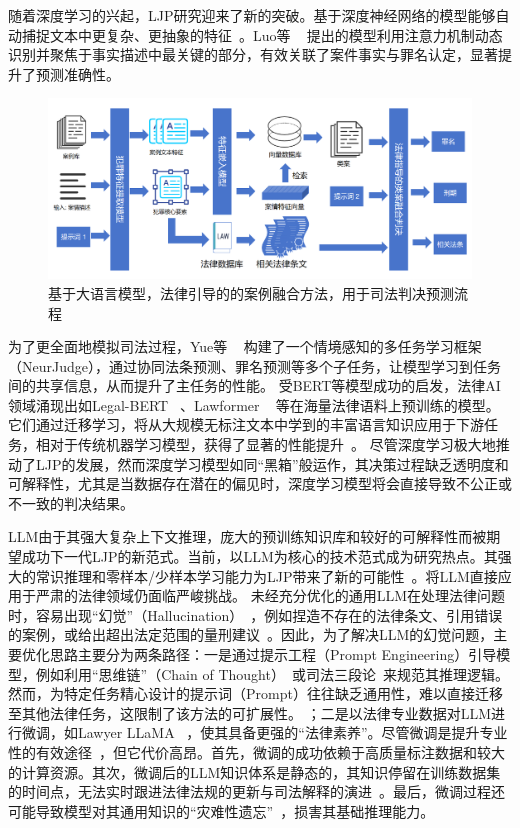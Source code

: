 随着深度学习的兴起，LJP研究迎来了新的突破。基于深度神经网络的模型能够自动捕捉文本中更复杂、更抽象的特征~\cite{cheng2025legal,dong2021legal,feng2022legal,jiang2018interpretable}。Luo等 ~\cite{huang2019improved} 提出的模型利用注意力机制动态识别并聚焦于事实描述中最关键的部分，有效关联了案件事实与罪名认定，显著提升了预测准确性。
\begin{figure}[htpb]
	\centering
	\includegraphics[width=1\textwidth]{fig/method.pdf}
	\caption{基于大语言模型，法律引导的的案例融合方法，用于司法判决预测流程}
	\label{fig:main}
\end{figure}
为了更全面地模拟司法过程，Yue等 ~\cite{yue2021neurjudge} 构建了一个情境感知的多任务学习框架（NeurJudge），通过协同法条预测、罪名预测等多个子任务，让模型学习到任务间的共享信息，从而提升了主任务的性能。
受BERT等模型成功的启发，法律AI领域涌现出如Legal-BERT ~\cite{liu2021robustly,chalkidis2020legal,deepa2021bidirectional,devlin2019bert,fan2022multi}、Lawformer ~\cite{xiao2021lawformer,du2022glm,fei2023lawbench} 等在海量法律语料上预训练的模型。它们通过迁移学习，将从大规模无标注文本中学到的丰富语言知识应用于下游任务，相对于传统机器学习模型，获得了显著的性能提升~\cite{cui2021pre,houlsby2019parameter,hu2018few}。
尽管深度学习极大地推动了LJP的发展，然而深度学习模型如同“黑箱”般运作，其决策过程缺乏透明度和可解释性，尤其是当数据存在潜在的偏见时，深度学习模型将会直接导致不公正或不一致的判决结果。

LLM由于其强大复杂上下文推理，庞大的预训练知识库和较好的可解释性而被期望成功下一代LJP的新范式。当前，以LLM为核心的技术范式成为研究热点。其强大的常识推理和零样本/少样本学习能力为LJP带来了新的可能性~\cite{brown2020language,huang2022towards}。将LLM直接应用于严肃的法律领域仍面临严峻挑战。
未经充分优化的通用LLM在处理法律问题时，容易出现“幻觉”（Hallucination）~\cite{cui2023survey}，例如捏造不存在的法律条文、引用错误的案例，或给出超出法定范围的量刑建议~\cite{lewis2020retrieval}。因此，为了解决LLM的幻觉问题，主要优化思路主要分为两条路径：一是通过提示工程（Prompt Engineering）引导模型，例如利用“思维链”（Chain of Thought）~\cite{kojima2022large,izacard2021leveraging}或司法三段论~\cite{huang2023lawyer}来规范其推理逻辑。然而，为特定任务精心设计的提示词（Prompt）往往缺乏通用性，难以直接迁移至其他法律任务，这限制了该方法的可扩展性。
；二是以法律专业数据对LLM进行微调，如Lawyer LLaMA ~\cite{chen2020recall}，使其具备更强的“法律素养”。尽管微调是提升专业性的有效途径~\cite{hu2021lora,hu2022lora}，但它代价高昂。首先，微调的成功依赖于高质量标注数据和较大的计算资源。其次，微调后的LLM知识体系是静态的，其知识停留在训练数据集的时间点，无法实时跟进法律法规的更新与司法解释的演进~\cite{li2021prefix}。最后，微调过程还可能导致模型对其通用知识的“灾难性遗忘”~\cite{chen2020recall}，损害其基础推理能力。

